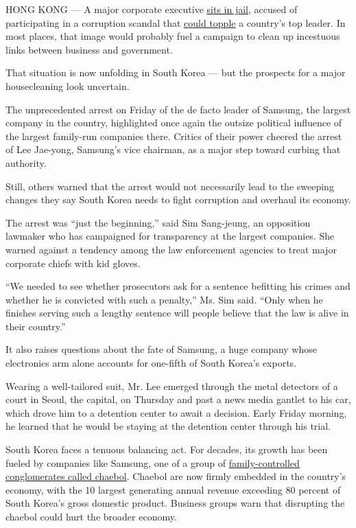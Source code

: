 HONG KONG --- A major corporate executive
\href{https://www.nytimes.com/2017/02/16/world/asia/korea-samsung-lee-jae-yong.html}{sits
in jail}, accused of participating in a corruption scandal that
\href{https://www.nytimes.com/2016/12/09/world/asia/south-korea-president-park-geun-hye-impeached.html}{could
topple} a country's top leader. In most places, that image would
probably fuel a campaign to clean up incestuous links between business
and government.

That situation is now unfolding in South Korea --- but the prospects for
a major housecleaning look uncertain.

The unprecedented arrest on Friday of the de facto leader of Samsung,
the largest company in the country, highlighted once again the outsize
political influence of the largest family-run companies there. Critics
of their power cheered the arrest of Lee Jae-yong, Samsung's vice
chairman, as a major step toward curbing that authority.

Still, others warned that the arrest would not necessarily lead to the
sweeping changes they say South Korea needs to fight corruption and
overhaul its economy.

The arrest was ``just the beginning,'' said Sim Sang-jeung, an
opposition lawmaker who has campaigned for transparency at the largest
companies. She warned against a tendency among the law enforcement
agencies to treat major corporate chiefs with kid gloves.

``We needed to see whether prosecutors ask for a sentence befitting his
crimes and whether he is convicted with such a penalty,'' Ms. Sim said.
``Only when he finishes serving such a lengthy sentence will people
believe that the law is alive in their country.''

It also raises questions about the fate of Samsung, a huge company whose
electronics arm alone accounts for one-fifth of South Korea's exports.

Wearing a well-tailored suit, Mr. Lee emerged through the metal
detectors of a court in Seoul, the capital, on Thursday and past a news
media gantlet to his car, which drove him to a detention center to await
a decision. Early Friday morning, he learned that he would be staying at
the detention center through his trial.

South Korea faces a tenuous balancing act. For decades, its growth has
been fueled by companies like Samsung, one of a group of
\href{https://www.nytimes.com/2017/02/17/business/south-korea-chaebol-samsung.html}{family-controlled
conglomerates called chaebol}. Chaebol are now firmly embedded in the
country's economy, with the 10 largest generating annual revenue
exceeding 80 percent of South Korea's gross domestic product. Business
groups warn that disrupting the chaebol could hurt the broader economy.

